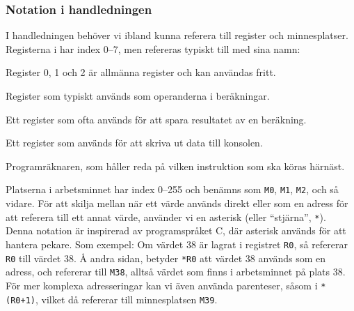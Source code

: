 \subsubsection{Notation i handledningen}
I handledningen behöver vi ibland kunna referera till register och minnesplatser. Registerna i \progname{} har index 0--7, men refereras typiskt till med sina namn:

\begin{description}[leftmargin=20mm]
    \item[\texttt{R0}--\texttt{R2}] Register 0, 1 och 2 är allmänna register och kan användas fritt.
    \item[\texttt{OP1}, \texttt{OP2}] Register som typiskt används som operanderna i beräkningar.
    \item[\texttt{RES}] Ett register som ofta används för att spara resultatet av en beräkning.
    \item[\texttt{OUT}] Ett register som används för att skriva ut data till konsolen.
    \item[\texttt{PC}] Programräknaren, som håller reda på vilken instruktion som ska köras härnäst.
\end{description}

Platserna i arbetsminnet har index 0--255 och benämns som \texttt{M0}, \texttt{M1}, \texttt{M2}, och så vidare. För att skilja mellan när ett värde används direkt eller som en adress för att referera till ett annat värde, använder vi en asterisk (eller ``stjärna'', \texttt{*}). Denna notation är inspirerad av programspråket C, där asterisk används för att hantera pekare. Som exempel: Om värdet 38 är lagrat i registret \texttt{R0}, så refererar \texttt{R0} till värdet 38. Å andra sidan, betyder \texttt{*R0} att värdet 38 används som en adress, och refererar till \texttt{M38}, alltså värdet som finns i arbetsminnet på plats 38. För mer komplexa adresseringar kan vi även använda parenteser, såsom i \texttt{*(R0+1)}, vilket då refererar till minnesplatsen \texttt{M39}.



